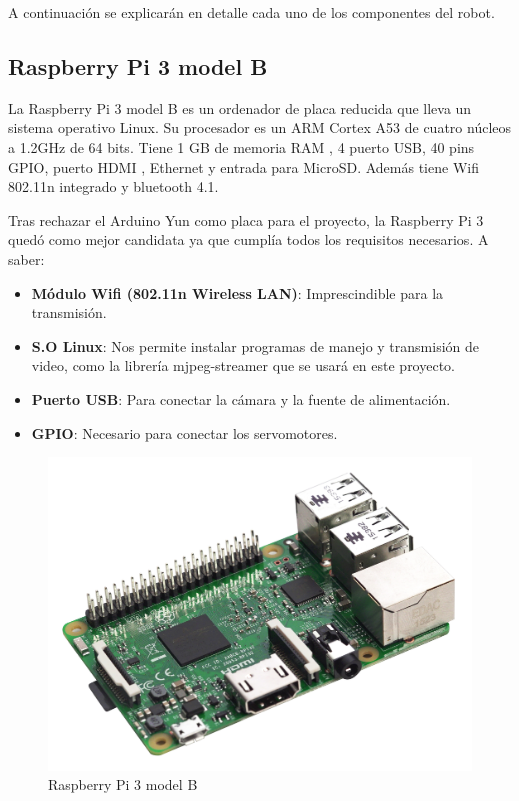 \documentclass[twoside, 11pt]{epstfg}
\begin{document}
A continuación se explicarán en detalle cada uno de los componentes del robot.

\subsection{Raspberry Pi 3 model B}
La Raspberry Pi 3 model B es un ordenador de placa reducida que lleva un sistema operativo Linux.
Su procesador es un ARM Cortex A53 de cuatro núcleos a 1.2GHz de 64 bits.
Tiene 1 GB de memoria RAM , 4 puerto USB, 40 pins GPIO, puerto HDMI , Ethernet y entrada para MicroSD.
Además tiene Wifi 802.11n integrado y bluetooth 4.1.

Tras rechazar el Arduino Yun como placa para el proyecto, la Raspberry Pi 3 quedó como mejor candidata ya que cumplía todos los requisitos necesarios. A saber:

\begin{itemize}
	\item \textbf{Módulo Wifi (802.11n Wireless LAN)}: Imprescindible para la transmisión.
	\item \textbf{S.O Linux}: Nos permite instalar programas de manejo y transmisión de video, como la librería mjpeg-streamer que se usará en este proyecto.
	\item \textbf{Puerto USB}: Para conectar la cámara y la fuente de alimentación.
	\item \textbf{GPIO}: Necesario para conectar los servomotores.
\end{itemize}


\begin{figure}[H]
	\centerline{
		\mbox{\includegraphics[width=.80\textwidth]{images/raspi3.jpg}}
	}
	\caption{Raspberry Pi 3 model B}
	
\end{figure}
\end{document}
